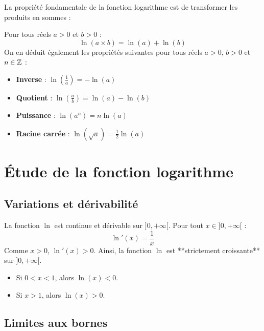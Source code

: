 La propriété fondamentale de la fonction logarithme est de transformer les produits en sommes :

\begin{propriete}
Pour tous réels $a > 0$ et $b > 0$ :
\[
\ln(a \times b) = \ln(a) + \ln(b)
\]
On en déduit également les propriétés suivantes pour tous réels $a > 0$, $b > 0$ et $n \in \mathbb{Z}$ :
\begin{itemize}
    \item \textbf{Inverse} : $\ln\left(\frac{1}{a}\right) = -\ln(a)$
    \item \textbf{Quotient} : $\ln\left(\frac{a}{b}\right) = \ln(a) - \ln(b)$
    \item \textbf{Puissance} : $\ln(a^n) = n \ln(a)$
    \item \textbf{Racine carrée} : $\ln(\sqrt{a}) = \frac{1}{2} \ln(a)$
\end{itemize}
\end{propriete}

\section{Étude de la fonction logarithme}

\subsection{Variations et dérivabilité}

\begin{theoreme}
La fonction $\ln$ est continue et dérivable sur $]0, +\infty[$. Pour tout $x \in ]0, +\infty[$ :
\[
\ln'(x) = \frac{1}{x}
\]
Comme $x > 0$, $\ln'(x) > 0$. Ainsi, la fonction $\ln$ est **strictement croissante** sur $]0, +\infty[$.
\end{theoreme}

\begin{propriete}
\begin{itemize}
    \item Si $0 < x < 1$, alors $\ln(x) < 0$.
    \item Si $x > 1$, alors $\ln(x) > 0$.
\end{itemize}
\end{propriete}

\subsection{Limites aux bornes}

